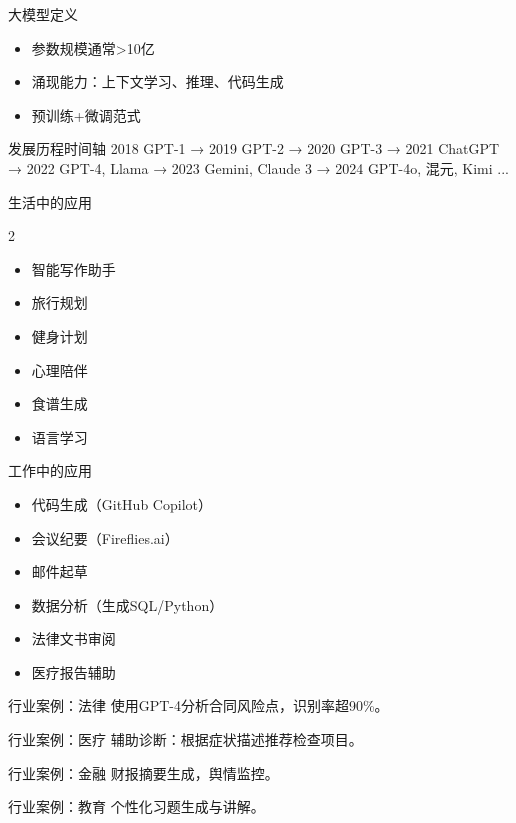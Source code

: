 \begin{frame}{大模型定义}
\begin{itemize}
    \item 参数规模通常>10亿
    \item 涌现能力：上下文学习、推理、代码生成
    \item 预训练+微调范式
\end{itemize}
\end{frame}

\begin{frame}{发展历程时间轴}
2018 GPT-1 → 2019 GPT-2 → 2020 GPT-3 → 2021 ChatGPT → 2022 GPT-4, Llama → 2023 Gemini, Claude 3 → 2024 GPT-4o, 混元, Kimi ...
\end{frame}

\begin{frame}{生活中的应用}
\begin{multicols}{2}
\begin{itemize}
    \item 智能写作助手
    \item 旅行规划
    \item 健身计划
    \item 心理陪伴
    \item 食谱生成
    \item 语言学习
\end{itemize}
\end{multicols}
\end{frame}

\begin{frame}{工作中的应用}
\begin{itemize}
    \item 代码生成（GitHub Copilot）
    \item 会议纪要（Fireflies.ai）
    \item 邮件起草
    \item 数据分析（生成SQL/Python）
    \item 法律文书审阅
    \item 医疗报告辅助
\end{itemize}
\end{frame}

\begin{frame}{行业案例：法律}
使用GPT-4分析合同风险点，识别率超90\%。
\end{frame}
\begin{frame}{行业案例：医疗}
辅助诊断：根据症状描述推荐检查项目。
\end{frame}
\begin{frame}{行业案例：金融}
财报摘要生成，舆情监控。
\end{frame}
\begin{frame}{行业案例：教育}
个性化习题生成与讲解。
\end{frame}

